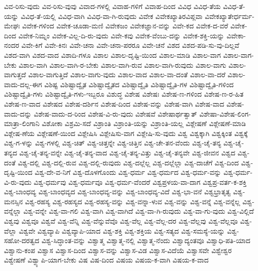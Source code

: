 {ವಿವ-ರಿಸು-ವುದು
ವಿವ-ರಿಸು-ವುವು
ವಿವಾದ-ಗಳಲ್ಲಿ
ವಿವಾಹ-ಗಳಿಗೆ
ವಿವಾಹ-ದಿಂದ
ವಿವಿಧ
ವಿವಿಧ-ತೆಯ
ವಿವಿಧ-ತೆ-ಯನ್ನು
ವಿವಿಧ-ತೆ-ಯಲ್ಲಿ
ವಿವಿಧ-ವಾಗಿ
ವಿವಿಧ-ವಾ-ಗಿ-ರುವುದು
ವಿವೇಕ
ವಿವೇಕಖ್ಯಾತಿರವಿಪ್ಲವಾ
ವಿವೇಕಖ್ಯಾತೇರ್ಧರ್ಮ-ಮೇಘಃ
ವಿವೇಕ-ಗಳಿಂದ
ವಿವೇಕ-ಚೂಡಾ-ಮಣಿ
ವಿವೇಕಜಂ
ವಿವೇಕಜ್ಞಾನ-ವನ್ನು
ವಿವೇ-ಕದ
ವಿವೇಕ-ದ-ವರೆ
ವಿವೇಕ-ದಿಂದ
ವಿವೇಕ-ನಿಮ್ನಂ
ವಿವೇಕ-ವಿಲ್ಲ-ದಿ-ರು-ವುದು
ವಿವೇ-ಕವು
ವಿವೇಕ-ವೆಂಬು-ದನ್ನು
ವಿವೇಕ-ಶಕ್ತಿ-ಯನ್ನು
ವಿವೇಕಾ-ನಂದರ
ವಿವೇ-ಕಿಗೆ
ವಿವೇ-ಕಿನಃ
ವಿವೇ-ಚನಾ
ವಿವೇ-ಚನಾ-ಪರರೂ
ವಿವೇ-ಚನೆ
ವಿಶದ
ವಿಶದ-ಪಡಿ-ಸು-ವು-ದಿಲ್ಲವೆ
ವಿಶದ-ವಾಗಿ
ವಿಶದ-ವಾದ
ವಿಶಾದಿ-ಗಳೂ
ವಿಶಾಲ
ವಿಶಾಲ-ದೃಷ್ಟಿ-ಯಿಂದ
ವಿಶಾಲ-ಮಾಡಿ
ವಿಶಾಲ-ವಾಗ
ವಿಶಾಲ-ವಾಗ-ಬೇಕು
ವಿಶಾಲ-ವಾಗಿ
ವಿಶಾಲ-ವಾಗಿ-ರ-ಬೇಕು
ವಿಶಾಲ-ವಾಗಿ-ರುವ
ವಿಶಾಲ-ವಾಗಿ-ರುವುದು
ವಿಶಾಲ-ವಾಗು
ವಿಶಾಲ-ವಾಗುತ್ತದೆ
ವಿಶಾಲ-ವಾಗುತ್ತಿದೆ
ವಿಶಾಲ-ವಾಗು-ವುದು
ವಿಶಾಲ-ವಾದ
ವಿಶಾಲ-ವಾ-ದಂತೆ
ವಿಶಾಲ-ವಾ-ದರೆ
ವಿಶಾಲ-ವಾದು-ದಲ್ಲ-ಈಗ
ವಿಶಿಷ್ಟ
ವಿಶಿಷ್ಟಾದ್ವೈತ
ವಿಶಿಷ್ಟಾದ್ವೈತದ
ವಿಶಿಷ್ಟಾದ್ವೈತಿ
ವಿಶಿಷ್ಟಾದ್ವೈತಿ-ಗಳ
ವಿಶಿಷ್ಟಾದ್ವೈತಿ-ಗಳಿಂದ
ವಿಶಿಷ್ಟಾದ್ವೈತಿ-ಗಳು
ವಿಶಿಷ್ಟಾದ್ವೈತಿ-ಗಳು-ಇಬ್ಬರೂ
ವಿಶುದ್ಧ
ವಿಶೇಷ
ವಿಶೇಷಃ
ವಿಶೇಷ-ಣ-ಗಳಿಂದ
ವಿಶೇಷ-ಣ-ರ-ಹಿತ
ವಿಶೇಷ-ಣ-ವಾದ
ವಿಶೇಷದ
ವಿಶೇಷ-ದರ್ಶಿನ
ವಿಶೇಷ-ದಿಂದ
ವಿಶೇಷ-ವನ್ನು
ವಿಶೇಷ-ವಾಗಿ
ವಿಶೇಷ-ವಾದ
ವಿಶೇಷ-ವಾದು-ದನ್ನು
ವಿಶೇಷ-ವಾದು-ದ-ರಿಂದ
ವಿಶೇಷ-ವಿ-ರು-ವುದು
ವಿಶೇಷವೆ
ವಿಶೇಷಾರ್ಥತ್ವಾತ್
ವಿಶೇಷಾ-ವಿಶೇಷ-ಲಿಂಗ-ಮಾತ್ರಾ-ಲಿಂಗಾನಿ
ವಿಶೋಕಾ
ವಿಶ್ರಮಿ-ಸದೆ
ವಿಶ್ರಾಂತಿ
ವಿಶ್ರಾಂತಿ-ಯನ್ನು
ವಿಶ್ರಾಂತಿ-ಯಲ್ಲ
ವಿಶ್ಲೇಷಣೆ
ವಿಶ್ಲೇಷಣೆ-ಮಾಡಿ
ವಿಶ್ಲೇಷ-ಣೆಯ
ವಿಶ್ಲೇಷಣೆ-ಯಿಂದ
ವಿಶ್ಲೇಷಿಸಿ
ವಿಶ್ಲೇಷಿಸು-ವಾಗ
ವಿಶ್ಲೇಷಿ-ಸು-ವುದು
ವಿಶ್ವ
ವಿಶ್ವಕ್ಕಾಗಿ
ವಿಶ್ವಕ್ಕಿಂತ
ವಿಶ್ವಕ್ಕೆ
ವಿಶ್ವ-ಗ-ಳನ್ನು
ವಿಶ್ವ-ಗಳಲ್ಲಿ
ವಿಶ್ವ-ಚಿತ್
ವಿಶ್ವ-ಚಿತ್ತನ್ನೇ
ವಿಶ್ವ-ಚಿತ್ತಿನ
ವಿಶ್ವ-ಚೇ-ತನ-ವೆಂದು
ವಿಶ್ವ-ಚೈ-ತನ್ಯ
ವಿಶ್ವ-ಚೈ-ತನ್ಯದ
ವಿಶ್ವ-ಚೈ-ತನ್ಯ-ವನ್ನೇ
ವಿಶ್ವ-ಚೈ-ತನ್ಯ-ವಾದ
ವಿಶ್ವ-ಚೈ-ತನ್ಯ-ವಿತ್ತು
ವಿಶ್ವ-ಚೈ-ತನ್ಯವೇ
ವಿಶ್ವ-ಜೀವನ
ವಿಶ್ವದ
ವಿಶ್ವ-ದಂತೆ
ವಿಶ್ವ-ದಲ್ಲಿ
ವಿಶ್ವ-ದಲ್ಲಿ-ರುವ
ವಿಶ್ವ-ದಲ್ಲಿ-ರುವುದು
ವಿಶ್ವ-ದಲ್ಲೆಲ್ಲ
ವಿಶ್ವ-ದಲ್ಲೆಲ್ಲಾ
ವಿಶ್ವ-ದಾಚೆಗೆ
ವಿಶ್ವ-ದಿಂದ
ವಿಶ್ವ-ದೃಷ್ಟಿ-ಯಿಂದ
ವಿಶ್ವ-ದೇ-ವ-ನಿಗೆ
ವಿಶ್ವ-ದೊಳಗೊಂದು
ವಿಶ್ವ-ಧರ್ಮ
ವಿಶ್ವ-ಧರ್ಮದ
ವಿಶ್ವ-ಧರ್ಮ-ವನ್ನು
ವಿಶ್ವ-ಧರ್ಮ-ವಿ-ರು-ವುದು
ವಿಶ್ವ-ಧರ್ಮವು
ವಿಶ್ವ-ಧರ್ಮವೂ
ವಿಶ್ವ-ಧರ್ಮ-ವೆಂದರೆ
ವಿಶ್ವಪ್ರಳಯ-ವಾ-ದಾಗ
ವಿಶ್ವಪ್ರ-ವರ್ತ-ಕ-ಶಕ್ತಿ
ವಿಶ್ವ-ಬಾಂಧವ್ಯ
ವಿಶ್ವ-ಬಾಂಧವ್ಯದ
ವಿಶ್ವ-ಬಾಂಧವ್ಯ-ವನ್ನು
ವಿಶ್ವ-ಬಾಂಧವ್ಯ-ವಿದೆ
ವಿಶ್ವ-ಭಾ-ವನೆ
ವಿಶ್ವಭ್ರಾತೃತ್ವ
ವಿಶ್ವ-ಮನಸ್ಸಿನ
ವಿಶ್ವ-ರಹಸ್ಯ
ವಿಶ್ವ-ರಹಸ್ಯದ
ವಿಶ್ವ-ರಹಸ್ಯ-ವನ್ನು
ವಿಶ್ವ-ವನ್ನಾ-ಳುವ
ವಿಶ್ವ-ವನ್ನು
ವಿಶ್ವ-ವನ್ನೆ
ವಿಶ್ವ-ವನ್ನೆಲ್ಲ
ವಿಶ್ವ-ವನ್ನೆಲ್ಲಾ
ವಿಶ್ವ-ವನ್ನೇ
ವಿಶ್ವ-ವಾ-ಗಲಿ
ವಿಶ್ವ-ವಾಗಿ
ವಿಶ್ವ-ವಾಗಿದೆ
ವಿಶ್ವ-ವಾ-ಗಿ-ರುವುದು
ವಿಶ್ವ-ವಾ-ಗು-ವುದು
ವಿಶ್ವ-ವಿಲ್ಲಿದೆ
ವಿಶ್ವವು
ವಿಶ್ವವೂ
ವಿಶ್ವವೆ
ವಿಶ್ವ-ವೆನ್ನಿ
ವಿಶ್ವ-ವೆನ್ನುವೆವೊ
ವಿಶ್ವ-ವೆಲ್ಲ
ವಿಶ್ವ-ವೆಲ್ಲ-ದರ
ವಿಶ್ವ-ವೆಲ್ಲವು
ವಿಶ್ವ-ವೆಲ್ಲವೂ
ವಿಶ್ವ-ವೆಲ್ಲಾ
ವಿಶ್ವವೇ
ವಿಶ್ವವ್ಯಾಪಿ
ವಿಶ್ವವ್ಯಾಪಿ-ಯಾದ
ವಿಶ್ವ-ಶಕ್ತಿ
ವಿಶ್ವ-ಶಕ್ತಿಯ
ವಿಶ್ವ-ಸತ್ಯದ
ವಿಶ್ವ-ಸಮಸ್ಯೆ-ಯನ್ನು
ವಿಶ್ವ-ಸಹೋ-ದರತ್ವದ
ವಿಶ್ವ-ಸಿದ್ಧಾಂತ-ವನ್ನು
ವಿಶ್ವಾತ್ಮ
ವಿಶ್ವಾತ್ಮ-ನಲ್ಲಿ
ವಿಶ್ವಾತ್ಮ-ನೆಂದು
ವಿಶ್ವಾದ್ಯಂತವೂ
ವಿಶ್ವಾಧಿ-ಪತಿ-ಯಾದ
ವಿಶ್ವಾನು-ಕಂಪ
ವಿಶ್ವಾಸ
ವಿಶ್ವಾಸ-ದಿಂದ
ವಿಶ್ವಾಸ-ವನ್ನು
ವಿಶ್ವಾಸ-ವಿಡ
ವಿಶ್ವಾಸ-ವಿದೆಯೆ
ವಿಶ್ವಾಸವೇ
ವಿಶ್ವೇಶ್ವರ
ವಿಶ್ವೇಷಣೆ
ವಿಶ್ವ್ಯಾಪಿ-ಯಾಗ-ಬೇಕು
ವಿಷ
ವಿಷ-ದಿಂದ
ವಿಷಯ
ವಿಷಯ-ಕ-ವಾಗಿ
ವಿಷಯ-ಕ-ವಾದ
}
